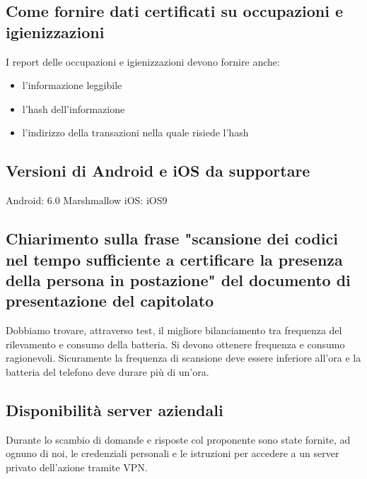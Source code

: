 \subsection*{Come fornire dati certificati su occupazioni e igienizzazioni}
I report delle occupazioni e igienizzazioni devono fornire anche:
\begin{itemize}
	\item l'informazione leggibile
	\item l'hash dell'informazione
	\item l'indirizzo della transazioni nella quale risiede l'hash
\end{itemize}

\subsection*{Versioni di Android e iOS da supportare}
Android: 6.0 Marshmallow \newline
iOS: iOS9


\subsection*{Chiarimento sulla frase "scansione dei codici nel tempo sufficiente a certificare la presenza della persona in postazione" del documento di presentazione del capitolato}
Dobbiamo trovare, attraverso test, il migliore bilanciamento tra frequenza del rilevamento e consumo della batteria. Si devono ottenere frequenza e consumo ragionevoli. Sicuramente la frequenza di scansione deve essere inferiore all'ora e la batteria del telefono deve durare più di un'ora.


\subsection*{Disponibilità server aziendali}
Durante lo scambio di domande e risposte col proponente sono state fornite, ad ognuno di noi, le credenziali personali e le istruzioni per accedere a un server privato dell'azione tramite VPN.




